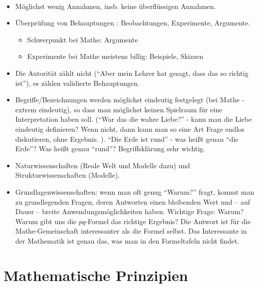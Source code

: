 \begin{bem}\ 
\begin{itemize}
	\item Möglichst wenig Annahmen, insb. keine überflüssigen Annahmen. 
	\item Überprüfung von Behauptungen : Beobachtungen, Experimente, Argumente. 
	\begin{itemize}
		\item Schwerpunkt bei Mathe: Argumente 
		\item Experimente bei Mathe meistens billig: Beispiele, Skizzen 
	\end{itemize} 
	\item Die Autorität zählt nicht (``Aber mein Lehrer hat gesagt, dass das so richtig ist''), es zählen validierte Behauptungen. 
	\item Begriffe/Bezeichnungen werden möglichst eindeutig festgelegt (bei Mathe - extrem eindeutig),  so dass man möglichst keinen Spielraum für eine Interpretation haben soll. (``War das die wahre Liebe?'' - kann man die Liebe eindeutig definieren? Wenn nicht, dann kann man so eine Art Frage endlos diskutieren, ohne Ergebnis. ). ``Die Erde ist rund'' - was heißt genau ``die Erde''? Was heißt genau ``rund''? Begriffsklärung sehr wichtig. 
	\item Naturwissenschaften (Reale Welt und Modelle dazu) und  Strukturwissenschaften (Modelle). 
	\item Grundlagenwissenschaften: wenn man oft genug ``Warum?'' fragt, kommt man zu grundlegenden Fragen, deren Antworten einen bleibenden Wert und -- auf Dauer -- breite Anwendungsmöglichkeiten haben. Wichtige Frage: Warum? Warum gibt uns die $pq$-Formel das richtige Ergebnis? Die Antwort ist für die Mathe-Gemeinschaft interessanter als die Formel selbst. Das Interessante in der Mathematik ist genau das, was man in den Formeltafeln nicht findet. 
\end{itemize} 
\end{bem}


\section{Mathematische Prinzipien} 

